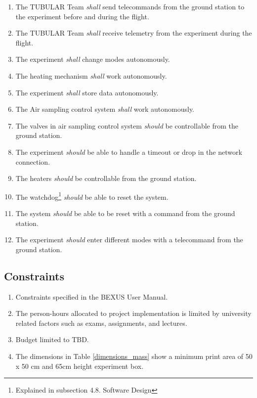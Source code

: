 \documentclass[a4paper,12pt,twoside]{article}
\begin{document}
\begin{enumerate}[label=O.\arabic*]
    \item The TUBULAR Team \textit{shall} send telecommands from the ground station to the experiment before and during the flight.
    \item The TUBULAR Team \textit{shall} receive telemetry from the experiment during the flight.
    \item The experiment \textit{shall} change modes autonomously.
    \item The heating mechanism \textit{shall} work autonomously.
    \item The experiment \textit{shall} store data autonomously.
    \item The Air sampling control system \textit{shall} work autonomously.
    \item The valves in air sampling control system \textit{should} be controllable from the ground station.
    \item The experiment \textit{should} be able to handle a timeout or drop in the network connection.
    \item The heaters \textit{should} be controllable from the ground station.
    \item The watchdog\footnote{Explained in subsection 4.8. Software Design} \textit{should} be able to reset the system.
    \item The system \textit{should} be able to be reset with a command from the ground station.
    \item The experiment \textit{should} enter different modes with a telecommand from the ground station.
\end{enumerate} 
\pagebreak
\subsection{Constraints}

\begin{enumerate}[label=C.\arabic*]
    \item Constraints specified in the BEXUS User Manual.
    \item The person-hours allocated to project implementation is limited by university related factors such as exams, assignments, and lectures.
    \item Budget limited to TBD.
    \item The dimensions in Table \ref{dimensions_mass} show a minimum print area of 50 x 50 cm and 65cm height experiment box.
\end{enumerate}
\end{document}
